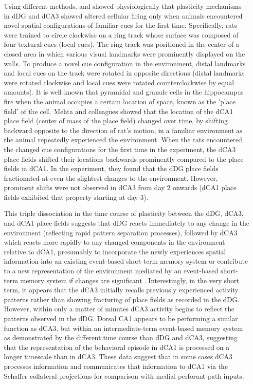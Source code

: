 \documentclass[doc, longtable]{apa6}
\begin{document}
Using different methods, \textcite{Lee2004d} and \textcite{Neunuebel2014a} showed physiologically that plasticity mechanisms in dDG and dCA3 showed altered cellular firing only when animals encountered novel spatial configurations of familiar cues for the first time. Specifically, rats were trained to circle clockwise on a ring track whose surface was composed of four textural cues (local cues). The ring track was positioned in the center of a closed area in which various visual landmarks were prominently displayed on the walls. To produce a novel cue configuration in the environment, distal landmarks and local cues on the track were rotated in opposite directions (distal landmarks were rotated clockwise and local cues were rotated counterclockwise by equal amounts). It is well known that pyramidal and granule cells in the hippocampus fire when the animal occupies a certain location of space, known as the 'place field' of the cell. Mehta and colleagues \cite{Mehta1997a, Mehta2000a} showed that the location of the dCA1 place field (center of mass of the place field) changed over time, by shifting backward opposite to the direction of rat's motion, in a familiar environment as the animal repeatedly experienced the environment. When the rats encountered the changed cue configurations for the first time in the \textcite{Lee2004d} experiment, the dCA3 place fields shifted their locations backwards prominently compared to the place fields in dCA1. In the \textcite{Neunuebel2014a} experiment, they found that the dDG place fields fractionated at even the slightest changes to the environment. However, prominent shifts were not observed in dCA3 from day 2 onwards (dCA1 place fields exhibited that property starting at day 3). 

This triple dissociation in the time course of plasticity between the dDG, dCA3, and dCA1 place fields suggests that dDG reacts immediately to any change in the environment (reflecting rapid pattern separation processes), followed by dCA3 which reacts more rapidly to any changed components in the environment relative to dCA1, presumably to incorporate the newly experiences spatial information into an existing event-based short-term memory system or contribute to a new representation of the environment mediated by an event-based short-term memory system if changes are significant \parencite{Neunuebel2014a}. Interestingly, in the very short term, it appears that the dCA3 initially recalls previously experienced activity patterns rather than showing fracturing of place fields as recorded in the dDG. However, within only a matter of minutes dCA3 activity begins to reflect the patterns observed in the dDG. Dorsal CA1 appears to be performing a similar function as dCA3, but within an intermediate-term event-based memory system as demonstrated by the different time course than dDG and dCA3, suggesting that the representation of the behavioral episode in dCA1 is processed on a longer timescale than in dCA3. These data suggest that in some cases dCA3 processes information and communicates that information to dCA1 via the Schaffer collateral projections for comparison with medial perforant path inputs. 
\end{document}
